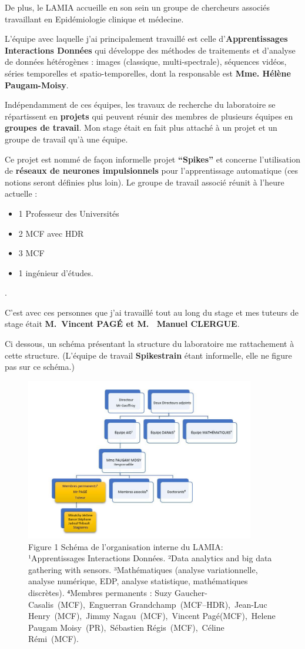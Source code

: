 De plus, le LAMIA accueille en son sein un groupe de chercheurs associés
travaillant en Epidémiologie clinique et médecine.

L'équipe avec laquelle j'ai principalement travaillé est
celle d'\textbf{Apprentissages Interactions Données} qui développe des
méthodes de traitements et d'analyse de données hétérogènes : images
(classique, multi-spectrale), séquences vidéos, séries temporelles et
spatio-temporelles, dont la responsable est \textbf{Mme. Hélène
Paugam-Moisy}.

Indépendamment de ces équipes, les travaux de recherche du laboratoire
se répartissent en \textbf{projets} qui peuvent réunir des membres de
plusieurs équipes en \textbf{groupes de travail}. Mon stage était en
fait plus attaché à un projet et un groupe de travail qu'à une équipe.

Ce projet est nommé de façon informelle projet \textbf{``Spikes''} et
concerne l'utilisation de \textbf{réseaux de neurones impulsionnels}
pour l'apprentissage automatique (ces notions seront définies plus
loin). Le groupe de travail associé réunit à l'heure actuelle :

\begin{itemize}
\tightlist
\item
  1 Professeur des Universités
\item
  2 MCF avec HDR
\item
  3 MCF
\item
  1 ingénieur d'études.
\end{itemize}.

C'est avec ces personnes que j'ai travaillé tout au long du stage et mes
tuteurs de stage était \textbf{M.~Vincent PAGÉ et M. ~Manuel CLERGUE}.

Ci dessous, un schéma présentant la structure du laboratoire me
rattachement à cette structure. (L'équipe de travail \textbf{Spikestrain}
étant informelle, elle ne figure pas sur ce schéma.)

\begin{figure}[h!]
\centering
\includegraphics[width=10cm]{./images/orga.jpg}
\caption{Figure 1 Schéma de l'organisation interne du LAMIA:
¹Apprentissages Interactions Données. ²Data analytics and big data
gathering with sensors. ³Mathématiques (analyse variationnelle, analyse
numérique, EDP, analyse statistique, mathématiques discrètes). ⁴Membres
permanents : Suzy Gaucher-Casalis~(MCF),~Enguerran
Grandchamp~(MCF--HDR),~Jean-Luc Henry~(MCF),~Jimmy Nagau~(MCF),~Vincent
Pagé(MCF),~Helene Paugam Moisy~(PR),~Sébastien Régis~(MCF),~Céline
Rémi~(MCF).}
\end{figure}

